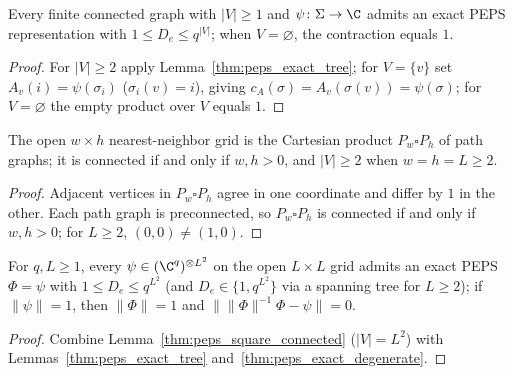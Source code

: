 \begin{lemma}
    \label{thm:peps_exact_degenerate}
    \leanok
    Every finite connected graph with $|V|\ge1$ and $\psi\colon\Sigma\to\C$
    admits an exact PEPS representation with $1\le D_e\le q^{|V|}$; when
    $V=\varnothing$, the contraction equals $1$.
\end{lemma}
\begin{proof}
    \leanok
    For $|V|\ge2$ apply Lemma~\ref{thm:peps_exact_tree}; for $V=\{v\}$ set
    $A_v(i)=\psi(\sigma_i)$ ($\sigma_i(v)=i$), giving
    $c_A(\sigma)=A_v(\sigma(v))=\psi(\sigma)$; for $V=\varnothing$ the empty
    product over $V$ equals $1$.
\end{proof}

\begin{lemma}
    \label{thm:peps_square_connected}
    \leanok
    The open $w\times h$ nearest-neighbor grid is the Cartesian product
    $P_w\square P_h$ of path graphs; it is connected if and only if $w,h>0$,
    and $|V|\ge2$ when $w=h=L\ge2$.
\end{lemma}
\begin{proof}
    \leanok
    Adjacent vertices in $P_w\square P_h$ agree in one coordinate and differ
    by $1$ in the other. Each path graph is preconnected, so $P_w\square P_h$
    is connected if and only if $w,h>0$; for $L\ge2$, $(0,0)\ne(1,0)$.
\end{proof}

\begin{lemma}
    \label{thm:peps_exact_square}
    \leanok
    For $q,L\ge1$, every $\psi\in(\C^q)^{\otimes L^2}$ on the open $L\times L$
    grid admits an exact PEPS $\Phi=\psi$ with $1\le D_e\le q^{L^2}$ (and
    $D_e\in\{1,q^{L^2}\}$ via a spanning tree for $L\ge2$); if $\|\psi\|=1$,
    then $\|\Phi\|=1$ and $\bigl\|\|\Phi\|^{-1}\Phi-\psi\bigr\|=0$.
\end{lemma}
\begin{proof}
    \leanok
    Combine Lemma~\ref{thm:peps_square_connected} ($|V|=L^2$) with
    Lemmas~\ref{thm:peps_exact_tree} and~\ref{thm:peps_exact_degenerate}.
\end{proof}

